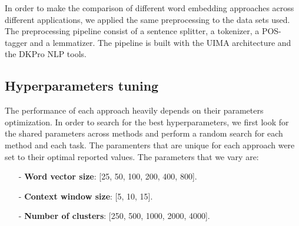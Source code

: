 \documentclass[11pt]{article}
\begin{document}
In order to make the comparison of different word embedding approaches across different applications, we applied the same preprocessing to the data sets used. 
The preprocessing pipeline consist of a sentence splitter, a tokenizer, a POS-tagger and a lemmatizer. The pipeline is built with the UIMA architecture and the DKPro NLP tools. 


\subsection{Hyperparameters tuning}

The performance of each approach heavily depends on their parameters optimization.
In order to search for the best hyperparameters, we first
look for the shared parameters across methods and perform a random search 
for each method and each task.
The paramenters that are unique for each approach were set to their optimal 
reported values. The parameters that we vary are:

\begin{small}
\begin{itemize}
\item[-]\textbf{Word vector size}: [25, 50, 100, 200, 400, 800].
\item[-]\textbf{Context window size}: [5, 10, 15].
\item[-]\textbf{Number of clusters}: [250, 500, 1000, 2000, 4000]. 
\end{itemize}
\end{small}
\end{document}
